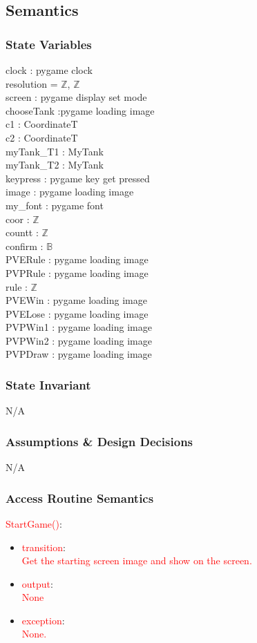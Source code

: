 \documentclass[12pt, titlepage]{article}
\begin{document}
		\subsection{Semantics}
		\subsubsection{State Variables}
		clock : pygame clock\\
		resolution = $\mathbb{Z}$, $\mathbb{Z}$\\
		screen : pygame display set mode\\
		chooseTank :pygame loading image\\
		c1 : CoordinateT\\
		c2 : CoordinateT\\
		myTank\_T1 : MyTank\\
		myTank\_T2 : MyTank\\
		keypress : pygame key get pressed\\
		image : pygame loading image\\
		my\_font : pygame font\\
		coor : $\mathbb{Z}$\\
		countt : $\mathbb{Z}$\\
		confirm : $\mathbb{B}$\\
		PVERule : pygame loading image\\
		PVPRule : pygame loading image\\
		rule : $\mathbb{Z}$\\
		PVEWin : pygame loading image\\
		PVELose : pygame loading image\\
		PVPWin1 : pygame loading image\\
		PVPWin2 : pygame loading image\\
		PVPDraw : pygame loading image\\
		
		
		\subsubsection{State Invariant}
		N/A
		
		\subsubsection{Assumptions \& Design Decisions}
		N/A
		\subsubsection{Access Routine Semantics}
		\textcolor{red}{StartGame()}:
		\begin{itemize}
		\item \textcolor{red}{transition}:\\ \textcolor{red}{Get the starting screen image and show on the screen.}
		\item \textcolor{red}{output}:\\\textcolor{red}{None}
		\item \textcolor{red}{exception}:\\\textcolor{red}{None.}
		\end{itemize}
		
\end{document}
